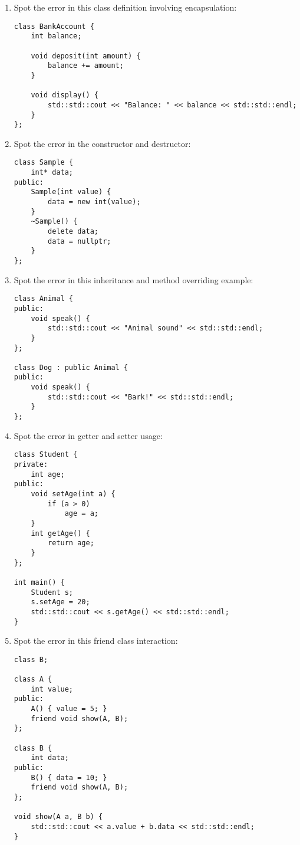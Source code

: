 \documentclass[a4paper,12pt]{article}
\begin{document}
\begin{enumerate}
    \item Spot the error in this class definition involving encapsulation:
\begin{lstlisting}
class BankAccount {
    int balance;

    void deposit(int amount) {
        balance += amount;
    }

    void display() {
        std::std::cout << "Balance: " << balance << std::std::endl;
    }
};
\end{lstlisting}

    \item Spot the error in the constructor and destructor:
\begin{lstlisting}
class Sample {
    int* data;
public:
    Sample(int value) {
        data = new int(value);
    }
    ~Sample() {
        delete data;
        data = nullptr;
    }
};
\end{lstlisting}

    \item Spot the error in this inheritance and method overriding example:
\begin{lstlisting}
class Animal {
public:
    void speak() {
        std::std::cout << "Animal sound" << std::std::endl;
    }
};

class Dog : public Animal {
public:
    void speak() {
        std::std::cout << "Bark!" << std::std::endl;
    }
};
\end{lstlisting}

    \item Spot the error in getter and setter usage:
\begin{lstlisting}
class Student {
private:
    int age;
public:
    void setAge(int a) {
        if (a > 0)
            age = a;
    }
    int getAge() {
        return age;
    }
};

int main() {
    Student s;
    s.setAge = 20;
    std::std::cout << s.getAge() << std::std::endl;
}
\end{lstlisting}

    \item Spot the error in this friend class interaction:
\begin{lstlisting}
class B;

class A {
    int value;
public:
    A() { value = 5; }
    friend void show(A, B);
};

class B {
    int data;
public:
    B() { data = 10; }
    friend void show(A, B);
};

void show(A a, B b) {
    std::std::cout << a.value + b.data << std::std::endl;
}
\end{lstlisting}


\end{enumerate}
\end{document}
